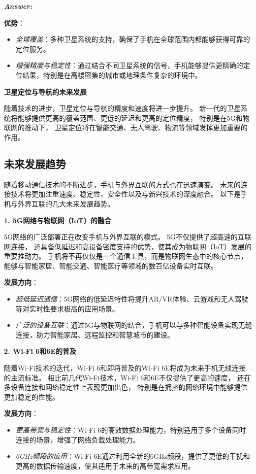 \documentclass[12pt]{article}
\newenvironment{Answer}{
  \vspace{12pt}
  {\large\textbf{\textit{\hspace{-12pt}Answer:}}}\par
  \vspace{8pt}
} {\vspace{24pt}}
\begin{document}
\begin{Answer}
\textbf{优势}：
\begin{itemize}
    \item \textit{全球覆盖}：多种卫星系统的支持，确保了手机在全球范围内都能够获得可靠的定位服务。
    \item \textit{增强精度与稳定性}：通过结合不同卫星系统的信号，手机能够提供更精确的定位结果，特别是在高楼密集的城市或地理条件复杂的环境中。
\end{itemize}

\noindent\textbf{卫星定位与导航的未来发展}\noindent

随着技术的进步，卫星定位与导航的精度和速度将进一步提升。
新一代的卫星系统将能够提供更高的覆盖范围、更低的延迟和更高的定位精度，
特别是在5G和物联网的推动下，
卫星定位将在智能交通、无人驾驶、物流等领域发挥更加重要的作用。

\subsection*{未来发展趋势}\noindent

随着移动通信技术的不断进步，手机与外界互联的方式也在迅速演变。
未来的连接技术将更加注重速度、稳定性、安全性以及与新兴技术的深度融合。
以下是手机与外界互联的几大未来发展趋势。

\noindent\textbf{1. 5G网络与物联网（IoT）的融合}\noindent

5G网络的广泛部署正在改变手机与外界互联的模式。
5G不仅提供了超高速的互联网连接，
还具备低延迟和高设备密度支持的优势，使其成为物联网（IoT）发展的重要推动力。
手机将不再仅仅是一个通信工具，而是物联网生态中的核心节点，
能够与智能家居、智能交通、智能医疗等领域的数百亿设备实时互联。

\textbf{发展方向}：
\begin{itemize}
    \item \textit{超低延迟通信}：5G网络的低延迟特性将提升AR/VR体验、云游戏和无人驾驶等对实时性要求极高的应用场景。
    \item \textit{广泛的设备互联}：通过5G与物联网的结合，手机可以与多种智能设备实现无缝连接，助力智能家居、远程监控和智慧城市的建设。
\end{itemize}

\noindent\textbf{2. Wi-Fi 6和6E的普及}\noindent

随着Wi-Fi技术的迭代，Wi-Fi 6和即将普及的Wi-Fi 6E将成为未来手机无线连接的主流标准。
相比前几代Wi-Fi技术，Wi-Fi 6和6E不仅提供了更高的速度，
还在多设备连接和网络稳定性上表现更加出色，
特别是在拥挤的网络环境中能够提供更加稳定的性能。

\textbf{发展方向}：
\begin{itemize}
    \item \textit{更高带宽与稳定性}：Wi-Fi 6的高效数据处理能力，特别适用于多个设备同时连接的场景，增强了网络负载处理能力。
    \item \textit{6GHz频段的应用}：Wi-Fi 6E通过利用全新的6GHz频段，提供了更低的干扰和更高的数据传输速度，使其适用于未来的高带宽需求应用。
\end{itemize}


\end{Answer}
\end{document}
